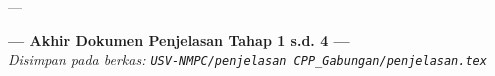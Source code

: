 \documentclass[11pt,a4paper]{article}
\begin{document}
---

\vspace{0.5cm}
\begin{center}
\textbf{--- Akhir Dokumen Penjelasan Tahap 1 s.d. 4 ---}\\
\textit{Disimpan pada berkas: \texttt{USV-NMPC/penjelasan CPP\_Gabungan/penjelasan.tex}}
\end{center}
\end{document}
